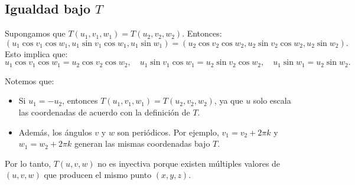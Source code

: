 \documentclass[12pt]{article}
\begin{document}
	\subsection*{Igualdad bajo \( T \)}
	Supongamos que \( T(u_1, v_1, w_1) = T(u_2, v_2, w_2) \). Entonces:
	\[
	(u_1 \cos v_1 \cos w_1, u_1 \sin v_1 \cos w_1, u_1 \sin w_1) = (u_2 \cos v_2 \cos w_2, u_2 \sin v_2 \cos w_2, u_2 \sin w_2).
	\]
	Esto implica que:
	\[
	u_1 \cos v_1 \cos w_1 = u_2 \cos v_2 \cos w_2, \quad
	u_1 \sin v_1 \cos w_1 = u_2 \sin v_2 \cos w_2, \quad
	u_1 \sin w_1 = u_2 \sin w_2.
	\]
	
	Notemos que:
	\begin{itemize}
		\item Si \( u_1 = -u_2 \), entonces \( T(u_1, v_1, w_1) = T(u_2, v_2, w_2) \), ya que \( u \) solo escala las coordenadas de acuerdo con la definición de \( T \).
		\item Además, los ángulos \( v \) y \( w \) son periódicos. Por ejemplo, \( v_1 = v_2 + 2\pi k \) y \( w_1 = w_2 + 2\pi k \) generan las mismas coordenadas bajo \( T \).
	\end{itemize}
	
	Por lo tanto, \( T(u, v, w) \) no es inyectiva porque existen múltiples valores de \( (u, v, w) \) que producen el mismo punto \( (x, y, z) \).
	
\end{document}
